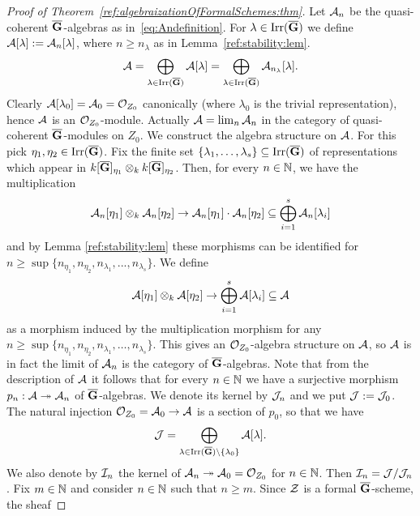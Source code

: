 \begin{proof}[Proof of Theorem~\ref{ref:algebraizationOfFormalSchemes:thm}]
    Let ${\mathcal A}_n$ be the quasi-coherent $\overline{\mathbf{G}}$-algebras as
    in~\eqref{eq:Andefinition}. For $\lambda\in \operatorname{Irr}(\overline{\mathbf{G}})$ we define
    ${\mathcal A}[\lambda] := {\mathcal A}_n[\lambda]$, where $n\geq n_{\lambda}$ as in
    Lemma~\ref{ref:stability:lem}.
    \[
        {\mathcal A}=\bigoplus_{\lambda\in
            \operatorname{Irr}(\overline{\mathbf{G}})}{\mathcal A}[\lambda]=\bigoplus_{\lambda\in
                \operatorname{Irr}(\overline{\mathbf{G}})}{\mathcal A}_{n_{\lambda}}[\lambda].
    \]
    Clearly ${\mathcal A}[\lambda_0] = {\mathcal A}_0 = {\mathcal O}_{Z_0}$ canonically (where
    $\lambda_0$ is the trivial representation), hence ${\mathcal A}$ is an
    ${\mathcal O}_{Z_0}$-module.
    Actually ${\mathcal A}=\lim_{n}{\mathcal A}_n$ in the category of quasi-coherent
    $\overline{\mathbf{G}}$-modules on $Z_0$.
    We construct the algebra structure on ${\mathcal A}$. For this
    pick $\eta_1, \eta_2\in \operatorname{Irr}(\overline{\mathbf{G}})$. Fix the finite set
    $\{\lambda_1, \ldots ,\lambda_s\}\subseteq \operatorname{Irr}(\overline{\mathbf{G}})$ of representations
    which appear in $k[\overline{\mathbf{G}}]_{\eta_1}\otimes_{k}k[\overline{\mathbf{G}}]_{\eta_2}$.
    Then, for every $n\in {\mathbb N}$, we have the multiplication
$${\mathcal A}_n[\eta_1]\otimes_{k} {\mathcal A}_n[\eta_2]\rightarrow {\mathcal A}_n[\eta_1]\cdot {\mathcal A}_n[\eta_2]\subseteq \bigoplus_{i=1}^s{\mathcal A}_n[\lambda_i]$$
and by Lemma \ref{ref:stability:lem} these morphisms can be identified for $n\geq \sup \{n_{\eta_1},n_{\eta_2},n_{\lambda_1},...,n_{\lambda_s}\}$. We define
$${\mathcal A}[\eta_1]\otimes_{k} {\mathcal A}[\eta_2]\rightarrow  \bigoplus_{i=1}^s{\mathcal A}[\lambda_i]\subseteq {\mathcal A}$$
as a morphism induced by the multiplication morphism for any $n\geq \sup
\{n_{\eta_1},n_{\eta_2},n_{\lambda_1}, \ldots ,n_{\lambda_s}\}$. This gives an
${\mathcal O}_{Z_0}$-algebra structure on ${\mathcal A}$, so ${\mathcal A}$ is in fact the limit of
${\mathcal A}_n$ is the category of $\overline{\mathbf{G}}$-algebras. Note that from the description of
${\mathcal A}$ it follows that for every $n\in {\mathbb N}$ we have a surjective morphism
$p_n:{\mathcal A}\twoheadrightarrow {\mathcal A}_n$ of $\overline{\mathbf{G}}$-algebras. We denote its kernel
by ${\mathcal J}_n$ and we put ${\mathcal J}:={\mathcal J}_0$. The natural injection ${\mathcal O}_{Z_0} = {\mathcal A}_0 \to {\mathcal A}$ is a section
of $p_0$, so that we have
\[
    {\mathcal J}=\bigoplus_{\lambda \in \operatorname{Irr}(\overline{\mathbf{G}})\setminus
        \{\lambda_0\}}{\mathcal A}[\lambda].
\]
We also denote by ${\mathcal I}_n$ the kernel of ${\mathcal A}_n\twoheadrightarrow
{\mathcal A}_0={\mathcal O}_{Z_0}$ for $n\in {\mathbb N}$. Then ${\mathcal I}_n={\mathcal J}/{\mathcal J}_n$.
Fix $m\in {\mathbb N}$ and consider $n\in {\mathbb N}$
such that $n\geq m$. Since ${\mathcal Z}$ is a formal $\overline{\mathbf{G}}$-scheme, the sheaf

\end{proof}
